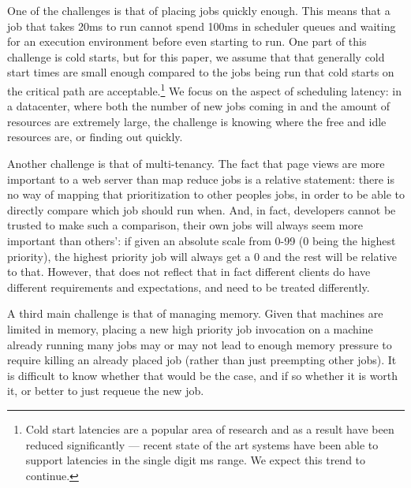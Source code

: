 One of the challenges is that of placing jobs quickly enough. This means that a
job that takes 20ms to run cannot spend 100ms in scheduler queues and waiting
for an execution environment before even starting to run. One part of this
challenge is cold starts, but for this paper, we assume that that generally cold
start times are small enough compared to the jobs being run that cold starts on
the critical path are acceptable.\footnote{Cold start latencies are a popular
area of research and as a result have been reduced significantly --- recent
state of the art systems have been able to support latencies in the single digit
ms range\cite{TODO}. We expect this trend to continue.} We focus on the aspect
of scheduling latency: in a datacenter, where both the number of new jobs coming
in and the amount of resources are extremely large, the challenge is knowing
where the free and idle resources are, or finding out quickly.

Another challenge is that of multi-tenancy. The fact that page views are more
important to a web server than map reduce jobs is a relative statement: there is
no way of mapping that prioritization to other peoples jobs, in order to be able
to directly compare which job should run when. And, in fact, developers cannot
be trusted to make such a comparison, their own jobs will always seem more
important than others': if given an absolute scale from 0-99 (0 being the
highest priority), the highest priority job will always get a 0 and the rest
will be relative to that. However, that does not reflect that in fact different
clients do have different requirements and expectations, and need to be treated
differently.

A third main challenge is that of managing memory. Given that machines are
limited in memory, placing a new high priority job invocation on a machine
already running many jobs may or may not lead to enough memory pressure to
require killing an already placed job (rather than just preempting other jobs).
It is difficult to know whether that would be the case, and if so whether it is
worth it, or better to just requeue the new job.

 
